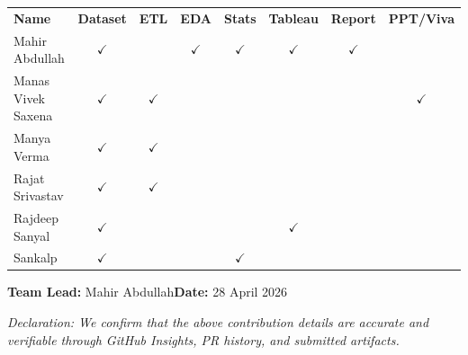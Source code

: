 \documentclass[11pt,a4paper]{article}
\begin{document}
\vspace{6pt}
{\footnotesize\setlength{\tabcolsep}{4pt}
\begin{tabularx}{\linewidth}{@{}p{3.0cm} CCCCCCC@{}}
  {\color{white}\bfseries Name} &
  {\color{white}\bfseries Dataset} &
  {\color{white}\bfseries ETL} &
  {\color{white}\bfseries EDA} &
  {\color{white}\bfseries Stats} &
  {\color{white}\bfseries Tableau} &
  {\color{white}\bfseries Report} &
  {\color{white}\bfseries PPT/Viva} \\
  Mahir Abdullah     & $\checkmark$ &              & $\checkmark$ & $\checkmark$ & $\checkmark$ & $\checkmark$ & \\
  Manas Vivek Saxena & $\checkmark$ & $\checkmark$ &              &              &              &              & $\checkmark$ \\
  Manya Verma        & $\checkmark$ & $\checkmark$ &              &              &              &              & \\
  Rajat Srivastav    & $\checkmark$ & $\checkmark$ &              &              &              &              & \\
  Rajdeep Sanyal     & $\checkmark$ &              &              &              & $\checkmark$ &              & \\
  Sankalp            & $\checkmark$ &              &              & $\checkmark$ &              &              & \\
  \bottomrule
\end{tabularx}}

\vspace{1.2cm}
\noindent\textbf{Team Lead:} Mahir Abdullah\qquad\textbf{Date:} 28 April 2026

\vspace{0.6cm}
{\small\color{rhoGray}\itshape Declaration: We confirm that the above contribution details are accurate and verifiable through GitHub Insights, PR history, and submitted artifacts.}
\end{document}
